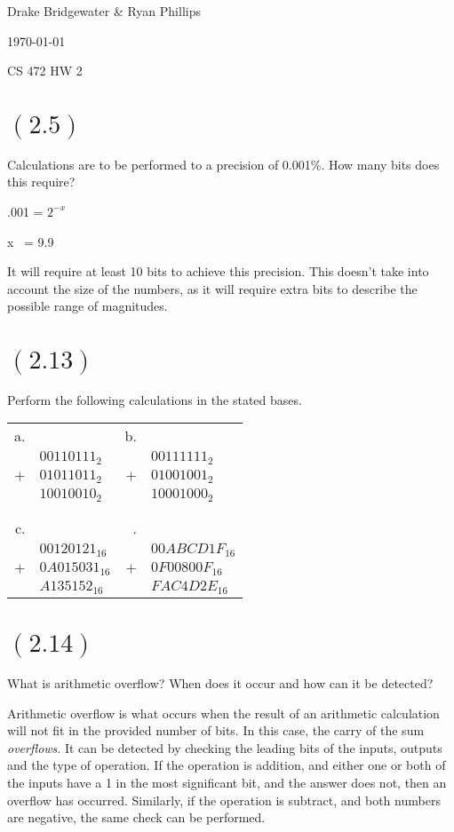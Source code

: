 \documentclass[letterpaper,12pt,titlepage]{article}
\def\name{Drake Bridgewater \& Ryan Phillips}
\begin{document}
\hfill \name

\hfill \today

\hfill CS 472 HW 2


\section*{$(2.5)$} Calculations are to be performed to a precision of 0.001\%. How many bits does this require?
  
.001 = $2^{-x}$

x ~= 9.9

It will require at least 10 bits to achieve this precision. This doesn't take into account the size of the numbers, as it will require extra bits to describe the possible range of magnitudes.

\section*{$(2.13)$} Perform the following calculations in the stated bases.

\begin{tabular}{r p{3cm}  r l}
a. 	&				& b. 	&					\\
	&	$00110111_{2}$ 		& 		& $00111111_{2}$   	\\
$+$ &	$01011011_{2}$ 		& $+$ 	& $01001001_{2}$	\\
\hline
	&	$10010010_{2}$ 		&  		& $10001000_{2}$	\\
 \\ \\
c. 	&				&   .	&					\\
	&	$00120121_{16}$		&  		& $00ABCD1F_{16}$ 	\\
$+$ &	$0A015031_{16}$ 	& $+$ 	& $0F00800F_{16}$ 	\\
\hline 
	&	$A135152_{16}$		&  		& $FAC4D2E_{16}$ 	\\
\end{tabular}


  
\section*{$(2.14)$} What is arithmetic overflow? When does it occur and how can it be detected?
  
Arithmetic overflow is what occurs when the result of an arithmetic calculation will not fit in the provided number of bits. In this case, the carry of the sum \textit{overflows}. It can be detected by checking the leading bits of the inputs, outputs and the type of operation. If the operation is addition, and either one or both of the inputs have a 1 in the most significant bit, and the answer does not, then an overflow has occurred. Similarly, if the operation is subtract, and both numbers are negative, the same check can be performed.
\end{document}
